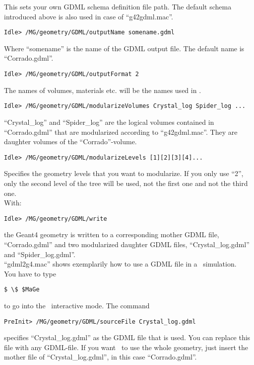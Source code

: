 This sets your own GDML schema definition file path. The default schema introduced above is also used in case of ``g42gdml.mac''.\\
\begin{lstlisting}
Idle> /MG/geometry/GDML/outputName somename.gdml
\end{lstlisting}
Where ``somename'' is the name of the GDML output file. The default name is ``Corrado.gdml''.\\
\begin{lstlisting}
Idle> /MG/geometry/GDML/outputFormat 2
\end{lstlisting}
The names of volumes, materials etc. will be the names used in \geant.\\
\begin{lstlisting}
Idle> /MG/geometry/GDML/modularizeVolumes Crystal_log Spider_log ...
\end{lstlisting}
``Crystal\_log'' and ``Spider\_log'' are the logical volumes contained in ``Corrado.gdml'' that are modularized according to ``g42gdml.mac''. They are daughter volumes of the ``Corrado''-volume.\\
\begin{lstlisting}
Idle> /MG/geometry/GDML/modularizeLevels [1][2][3][4]...
\end{lstlisting}
Specifies the geometry levels that you want to modularize. If you only use ``2'', only the second level of the tree will be used, not the first one and not the third one.\\
With:
\begin{lstlisting}
Idle> /MG/geometry/GDML/write
\end{lstlisting}
the Geant4 geometry is written to a corresponding mother GDML file, ``Corrado.gdml'' and two modularized daughter GDML files, ``Crystal\_log.gdml'' and ``Spider\_log.gdml''.\\
\vspace{5mm}
``gdml2g4.mac'' shows exemplarily how to use a GDML file in a \geant \ simulation.\\
You have to type
\begin{lstlisting}
$ \$ $MaGe
\end{lstlisting}
to go into the \mage \ interactive mode.
The command
\begin{lstlisting}
PreInit> /MG/geometry/GDML/sourceFile Crystal_log.gdml
\end{lstlisting}
specifies ``Crystal\_log.gdml'' as the GDML file that is used. You can replace this file with any GDML-file. If you want \mage \ to use the whole geometry, just insert the mother file of ``Crystal\_log.gdml'', in this case ``Corrado.gdml''.\\
